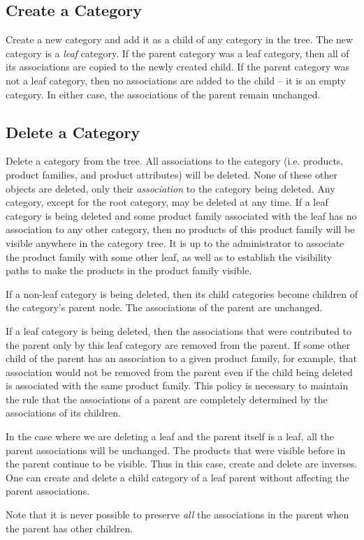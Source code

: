 \documentclass[letterpaper, 12pt]{article}
\begin{document}
\subsection{Create a Category}
Create a new category and add it as a child of any category in the tree.  The new category is a {\em leaf} category.  If the parent category was a leaf category, then all of its associations are copied to the newly created child.  If the parent category was not a leaf category, then no associations are added to the child -- it is an empty category.   In either case, the associations of the parent remain unchanged.

\subsection{Delete a Category}
Delete a category from the tree. All associations to the category (i.e. products, product families, and product attributes) will be deleted.  None of these other objects are deleted, only their {\em association} to the category being deleted.  Any category, except for the root category, may be deleted at any time.  If a leaf category is being deleted and some product family associated with the leaf has no association to any other category, then no products of this product family will be visible anywhere in the category tree.  It is up to the administrator to associate the product family with some other leaf, as well as to establish the visibility paths to make the products in the product family visible.
\par
 If a non-leaf category is being deleted, then its child categories become children of the category's parent node.  The associations of the parent are unchanged.
\par
If a leaf category is being deleted, then the associations that were contributed to the parent only by this leaf category are removed from the parent.  If some other child of the parent has an association to a given product family, for example, that association would not be removed from the parent even if the child being deleted is associated with the same product family.  This policy is necessary to maintain the rule that the associations of a parent are completely determined by the associations of its children.
\par
In the case where we are deleting a leaf and the parent itself is a leaf, all the parent associations will be unchanged.  The products that were visible before in the parent continue to be visible.  Thus in this case, create and delete are inverses.  One can create and delete a child category of a leaf parent without affecting the parent associations.
\par
Note that it is never possible to preserve {\em all} the associations in the parent when the parent has other children.
\end{document}
